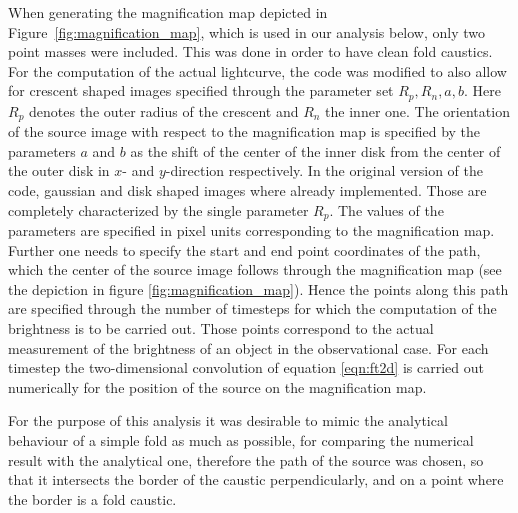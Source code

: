 When generating the magnification map depicted in
Figure~\ref{fig:magnification_map}, which is used in our analysis
below, only two point masses were included.  This was done in order to
have clean fold caustics.  For the computation of the actual
lightcurve, the code was modified to also allow for crescent shaped
images specified through the parameter set $R_p,R_n,a,b$. Here $R_p$
denotes the outer radius of the crescent and $R_n$ the inner one. The
orientation of the source image with respect to the magnification map
is specified by the parameters $a$ and $b$ as the shift of the center
of the inner disk from the center of the outer disk in $x$- and
$y$-direction respectively. In the original version of the code,
gaussian and disk shaped images where already implemented. Those are
completely characterized by the single parameter $R_p$. The values of
the parameters are specified in pixel units corresponding to the
magnification map. Further one needs to specify the start and end
point coordinates of the path, which the center of the source image
follows through the magnification map (see the depiction in figure
\ref{fig:magnification_map}). Hence the points along this path are
specified through the number of timesteps for which the computation of
the brightness is to be carried out. Those points correspond to the
actual measurement of the brightness of an object in the observational
case. For each timestep the two-dimensional convolution of equation
\ref{eqn:ft2d} is carried out numerically for the position of the
source on the magnification map.

For the purpose of this analysis it was desirable to mimic the
analytical behaviour of a simple fold as much as possible, for
comparing the numerical result with the analytical one, therefore the
path of the source was chosen, so that it intersects the border of the
caustic perpendicularly, and on a point where the border is a fold
caustic.

